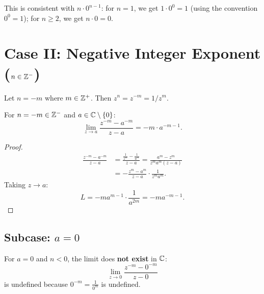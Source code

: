 \begin{remark}
This is consistent with $n \cdot 0^{n-1}$: for $n = 1$, we get $1 \cdot 0^0 = 1$ (using the convention $0^0 = 1$); for $n \geq 2$, we get $n \cdot 0 = 0$.
\end{remark}

\section{Case II: Negative Integer Exponent ($n \in \mathbb{Z}^-$)}

Let $n = -m$ where $m \in \mathbb{Z}^+$. Then $z^n = z^{-m} = 1/z^m$.

\begin{theorem}
For $n = -m \in \mathbb{Z}^-$ and $a \in \mathbb{C} \setminus \{0\}$:
\begin{equation}
\lim_{z \to a} \frac{z^{-m} - a^{-m}}{z - a} = -m \cdot a^{-m-1}.
\end{equation}
\end{theorem}

\begin{proof}
\begin{align}
\frac{z^{-m} - a^{-m}}{z - a} &= \frac{\frac{1}{z^m} - \frac{1}{a^m}}{z - a} = \frac{a^m - z^m}{z^m a^m (z - a)} \\
&= -\frac{z^m - a^m}{z - a} \cdot \frac{1}{z^m a^m}.
\end{align}
Taking $z \to a$:
\begin{equation}
L = -m a^{m-1} \cdot \frac{1}{a^{2m}} = -m a^{-m-1}.
\end{equation}
\end{proof}

\subsection{Subcase: $a = 0$}

\begin{warning}
For $a = 0$ and $n < 0$, the limit does \textbf{not exist} in $\mathbb{C}$:
\begin{equation}
\lim_{z \to 0} \frac{z^{-m} - 0^{-m}}{z - 0}
\end{equation}
is undefined because $0^{-m} = \frac{1}{0^m}$ is undefined.
\end{warning}

